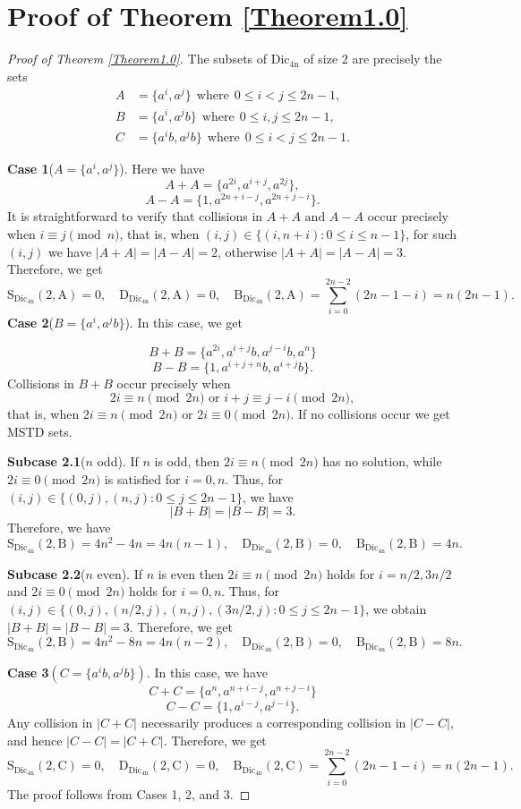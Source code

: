 \documentclass[11pt,reqno]{amsart}
\numberwithin{equation}{section}
\begin{document}
\section{Proof of Theorem \ref{Theorem1.0}}\label{section-3}
\begin{proof}[Proof of Theorem \ref{Theorem1.0}]
The subsets of $\mathrm{Dic_{4n}}$ of size $2$ are precisely the sets
$$\begin{aligned}
A&=\{a^i,a^j\}~~\text{where}~~0\leq i<j\leq 2n-1,\\
B&=\{a^i,a^jb\}~~\text{where}~~0\leq i,j\leq 2n-1,\\
C&=\{a^ib,a^jb\}~~\text{where}~~0\leq i<j\leq 2n-1.\end{aligned}$$

\textbf{Case 1}($A=\{a^i,a^j\}$). Here we have $$A+A=\{a^{2i},a^{i+j},a^{2j}\},$$
$$A-A=\{1,a^{2n+i-j},a^{2n+j-i}\}.$$
It is straightforward to verify that collisions in $A+A\text{ and }A-A$ occur precisely when $i\equiv j \pmod{n}$, that is, when $(i,j)\in \{(i,n+i): 0\leq i\leq n-1\}$, for such $(i,j)$ we have $|A+A|=|A-A|=2$, otherwise $|A+A|=|A-A|=3$. Therefore, we get
$$\mathrm{S_{\mathrm{Dic_{4n}}}(2,A)}=0,\quad \mathrm{D_{\mathrm{Dic_{4n}}}(2,A)}=0,\quad \mathrm{B_{\mathrm{Dic_{4n}}}(2,A)}=\sum_{i=0}^{2n-2}(2n-1-i)=n(2n-1).$$
\textbf{Case 2}($B=\{a^i,a^jb\}$). In this case, we get 

$$B+B=\{a^{2i},a^{i+j}b,a^{j-i}b,a^n\}$$
$$B-B=\{1,a^{i+j+n}b,a^{i+j}b\}.$$
Collisions in $B+B$ occur precisely when   $$2i\equiv n \pmod{2n} \text{ or }i+j\equiv j-i \pmod{2n},$$ that is, when $2i\equiv n \pmod{2n} \text{ or }2i\equiv 0\pmod{2n}$. If no collisions occur we get MSTD sets. \par
\textbf{Subcase 2.1}($n$ odd).
If $n$ is odd, then $2i\equiv n \pmod{2n}$ has no solution, while $2i\equiv 0 \pmod{2n}$ is satisfied for $i=0,n$. Thus, for  $(i,j)\in \{(0,j),(n,j): 0\leq j\leq 2n-1\}$, we have $$|B+B|=|B-B|=3.$$ Therefore, we have
$$\mathrm{S_{\mathrm{Dic_{4n}}}(2,B)}=4n^2-4n=4n(n-1),\quad \mathrm{D_{\mathrm{Dic_{4n}}}(2,B)}=0,\quad \mathrm{B_{\mathrm{Dic_{4n}}}(2,B)}=4n.$$\par
\textbf{Subcase 2.2}($n$ even).
If $n$ is even then $2i\equiv n \pmod{2n}$ holds for  $i=n/2,3n/2$ and $2i\equiv 0 \pmod{2n}$ holds for $i=0,n$. Thus, for  $(i,j)\in \{(0,j),(n/2,j),(n,j),(3n/2,j): 0\leq j\leq 2n-1\}$, we obtain $|B+B|=|B-B|=3$. Therefore, we get 
$$\mathrm{S_{\mathrm{Dic_{4n}}}(2,B)}=4n^2-8n=4n(n-2),\quad \mathrm{D_{\mathrm{Dic_{4n}}}(2,B)}=0,\quad \mathrm{B_{\mathrm{Dic_{4n}}}(2,B)}=8n.$$

\noindent\textbf{Case 3}$(C=\{a^ib,a^jb\})$. In this case, we have 
$$C+C=\{a^{n},a^{n+i-j},a^{n+j-i}\}$$ 
$$C-C=\{1,a^{i-j},a^{j-i}\}.$$ Any collision in  $|C+C|$ necessarily produces a corresponding collision in $|C-C|$, and hence 
$|C-C|=|C+C|$. Therefore, we get 
$$\mathrm{S_{\mathrm{Dic_{4n}}}(2,C)}=0,\quad \mathrm{D_{\mathrm{Dic_{4n}}}(2,C)}=0,\quad \mathrm{B_{\mathrm{Dic_{4n}}}(2,C)}=\sum_{i=0}^{2n-2}(2n-1-i)=n(2n-1).$$
The proof follows from Cases 1, 2, and 3.
\end{proof}
\end{document}

